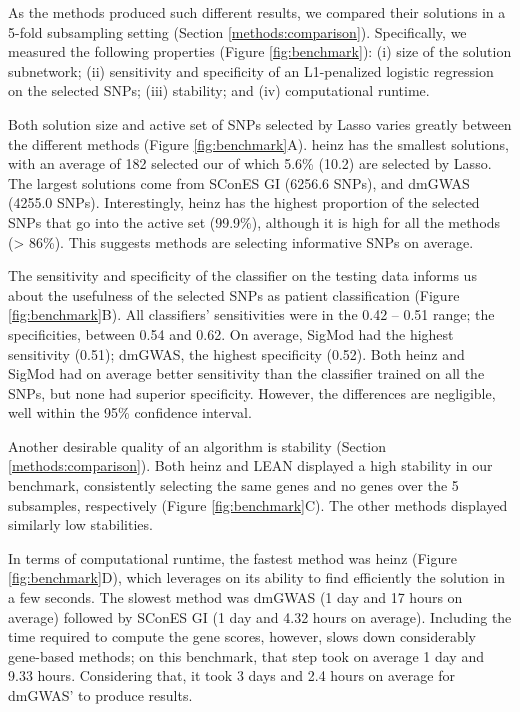 \documentclass[twocolumn, 10pt]{article}
\begin{document}
As the methods produced such different results, we compared their solutions in a 5-fold subsampling setting (Section \ref{methods:comparison}). Specifically, we measured the following properties (Figure \ref{fig:benchmark}): (i) size of the solution subnetwork; (ii) sensitivity and specificity of an L1-penalized logistic regression on the selected SNPs; (iii) stability; and (iv) computational runtime.

Both solution size and active set of SNPs selected by Lasso varies greatly between the different methods (Figure \ref{fig:benchmark}A). heinz has the smallest solutions, with an average of 182 selected our of which 5.6\% (10.2) are selected by Lasso. The largest solutions come from SConES GI (6256.6 SNPs), and dmGWAS (4255.0 SNPs). Interestingly, heinz has the highest proportion of the selected SNPs that go into the active set (99.9\%), although it is  high for all the methods (> 86\%). This suggests methods are selecting informative SNPs on average. 

The sensitivity and specificity of the classifier on the testing data informs us about the usefulness of the selected SNPs as patient classification (Figure \ref{fig:benchmark}B). All classifiers' sensitivities were in the 0.42 -- 0.51 range; the specificities, between 0.54 and 0.62. On average, SigMod had the highest sensitivity (0.51); dmGWAS, the highest specificity (0.52). Both heinz and SigMod had on average better sensitivity than the classifier trained on all the SNPs, but none had superior specificity. However, the differences are negligible, well within the 95\% confidence interval.   

Another desirable quality of an algorithm is stability (Section \ref{methods:comparison}). Both heinz and LEAN displayed a high stability in our benchmark, consistently selecting the same genes and no genes over the 5 subsamples, respectively (Figure \ref{fig:benchmark}C). The other methods displayed similarly low stabilities. 

In terms of computational runtime, the fastest method was heinz (Figure \ref{fig:benchmark}D), which leverages on its ability to find efficiently the solution in a few seconds. The slowest method was dmGWAS (1 day and 17 hours on average) followed by SConES GI (1 day and 4.32 hours on average). Including the time required to compute the gene scores, however, slows down considerably gene-based methods; on this benchmark, that step took on average 1 day and 9.33 hours. Considering that, it took 3 days and 2.4 hours on average for dmGWAS' to produce results. 
\end{document}

